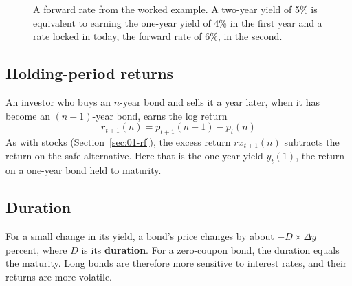 \begin{figure}[htbp]
\centering
{}
\caption{A forward rate from the worked example. A two-year yield of 5\% is equivalent to earning the one-year yield of 4\% in the first year and a rate locked in today, the forward rate of 6\%, in the second.}
\label{fig:07-forward-diagram}
\end{figure}


\subsection{Holding-period returns}

An investor who buys an $n$-year bond and sells it a year later, when it has become an $(n-1)$-year bond, earns the log return
\begin{equation}
  r_{t+1}(n) = p_{t+1}(n-1) - p_t(n)
  \label{eq:07-hpr}
\end{equation}
As with stocks (Section~\ref{sec:01-rf}), the excess return $rx_{t+1}(n)$ subtracts the return on the safe alternative. Here that is the one-year yield $y_t(1)$, the return on a one-year bond held to maturity.

\subsection{Duration}

For a small change in its yield, a bond's price changes by about $-D \times \Delta y$ percent, where $D$ is its \textbf{duration}. For a zero-coupon bond, the duration equals the maturity. Long bonds are therefore more sensitive to interest rates, and their returns are more volatile.

